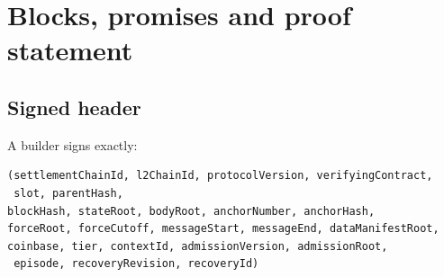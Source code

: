 \documentclass[a4paper,11pt]{article}
\begin{document}
\section{Blocks, promises and proof statement}\label{sec:blocks}

\subsection{Signed header}\label{sec:signed-header}

A builder signs exactly:

\begin{verbatim}
(settlementChainId, l2ChainId, protocolVersion, verifyingContract,
 slot, parentHash,
blockHash, stateRoot, bodyRoot, anchorNumber, anchorHash,
forceRoot, forceCutoff, messageStart, messageEnd, dataManifestRoot,
coinbase, tier, contextId, admissionVersion, admissionRoot,
 episode, recoveryRevision, recoveryId)
\end{verbatim}
\end{document}
